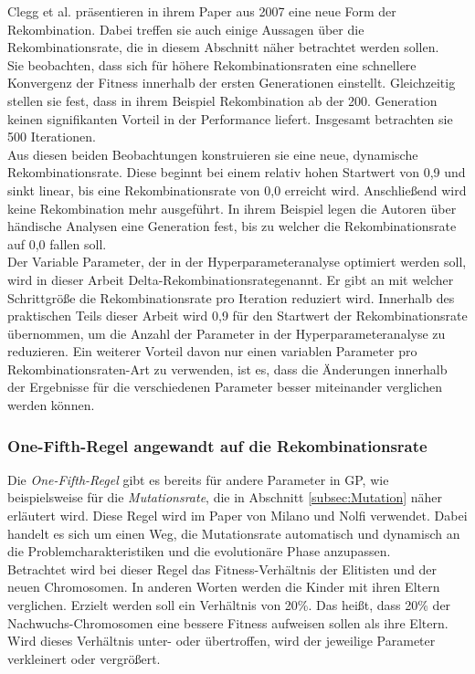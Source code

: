 Clegg et al. präsentieren in ihrem Paper aus 2007 eine neue Form der Rekombination.
Dabei treffen sie auch einige Aussagen über die Rekombinationsrate, die in diesem Abschnitt näher betrachtet werden sollen. \cite{clegg_new_2007}\\
Sie beobachten, dass sich für höhere Rekombinationsraten eine schnellere Konvergenz der Fitness innerhalb der ersten Generationen einstellt.
Gleichzeitig stellen sie fest, dass in ihrem Beispiel Rekombination ab der 200. Generation keinen signifikanten Vorteil in der Performance liefert.
Insgesamt betrachten sie 500 Iterationen.\\
Aus diesen beiden Beobachtungen konstruieren sie eine neue, dynamische Rekombinationsrate.
Diese beginnt bei einem relativ hohen Startwert von 0,9 und sinkt linear, bis eine Rekombinationsrate von 0,0 erreicht wird.
Anschließend wird keine Rekombination mehr ausgeführt.
In ihrem Beispiel legen die Autoren über händische Analysen eine Generation fest, bis zu welcher die Rekombinationsrate auf 0,0 fallen soll.\\
Der Variable Parameter, der in der Hyperparameteranalyse optimiert werden soll, wird in dieser Arbeit \glqq Delta-Rekombinationsrate\grqq\space genannt.
Er gibt an mit welcher Schrittgröße die Rekombinationsrate pro Iteration reduziert wird.
Innerhalb des praktischen Teils dieser Arbeit wird 0,9 für den Startwert der Rekombinationsrate übernommen, um die Anzahl der Parameter in der Hyperparameteranalyse zu reduzieren.
Ein weiterer Vorteil davon nur einen variablen Parameter pro Re\-kom\-bi\-na\-tions\-ra\-ten-Art zu verwenden, ist es, dass die Änderungen innerhalb der Ergebnisse für die verschiedenen Parameter besser miteinander verglichen werden können.

\subsubsection{One-Fifth-Regel angewandt auf die Rekombinationsrate}
\label{subsubsec:oneFifthCrossover}

Die \emph{One-Fifth-Regel} gibt es bereits für andere Parameter in GP, wie beispielsweise für die \emph{Mutationsrate}, die in Abschnitt \ref{subsec:Mutation} näher erläutert wird.
Diese Regel wird im Paper von Milano und Nolfi verwendet.
Dabei handelt es sich um einen Weg, die Mutationsrate automatisch und dynamisch an die Problemcharakteristiken und die evolutionäre Phase anzupassen. \cite{milano_scaling_2018}\\
Betrachtet wird bei dieser Regel das Fitness-Verhältnis der Elitisten und der neuen Chromosomen.
In anderen Worten werden die Kinder mit ihren Eltern verglichen.
Erzielt werden soll ein Verhältnis von 20\%.
Das heißt, dass 20\% der Nachwuchs-Chromosomen eine bessere Fitness aufweisen sollen als ihre Eltern.
Wird dieses Verhältnis unter- oder übertroffen, wird der jeweilige Parameter verkleinert oder vergrößert. \cite{doerr_self-adjusting_2019}

